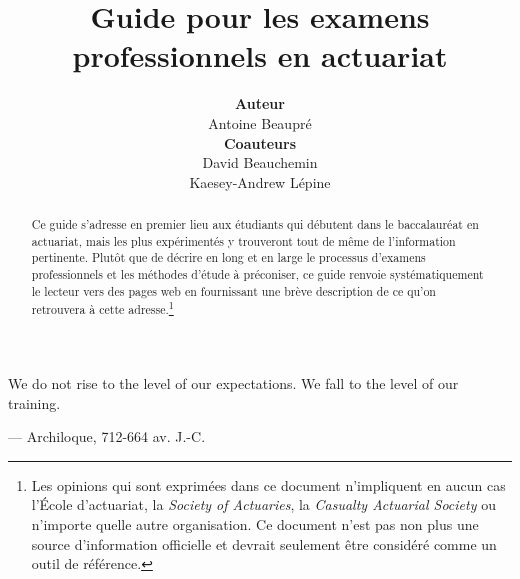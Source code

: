 \documentclass[11pt,french]{article}
\title{\vspace{2cm}
	   Guide pour les examens professionnels en actuariat
       \vspace{2cm}}
\author{\textbf{Auteur} \\
				Antoine Beaupré \vspace{2cm} \\
				\textbf{Coauteurs} \\
				David Beauchemin \\ 
				Kaesey-Andrew Lépine \vspace{4cm}}
\begin{document}
\maketitle
\thispagestyle{fancy}

\newpage

\begin{abstract}
Ce guide s'adresse en premier lieu aux étudiants qui débutent dans le baccalauréat en actuariat, mais les plus expérimentés y trouveront tout de même de l'information pertinente. Plutôt que de décrire en long et en large le processus d'examens professionnels et les méthodes d'étude à préconiser, ce guide renvoie systématiquement le lecteur vers des pages web en fournissant une brève description de ce qu'on retrouvera à cette adresse.\footnote{Les opinions qui sont exprimées dans ce document n'impliquent en aucun cas l'École d'actuariat, la \emph{Society of Actuaries}, la \emph{Casualty Actuarial Society} ou n'importe quelle autre organisation. Ce document n'est pas non plus une source d'information officielle et devrait seulement être considéré comme un outil de référence.}{\tiny} 
\end{abstract}

\clearpage
{}
\begin{center}
\begin{minipage}{.6\textwidth}
\epigraph{We do not rise to the level of our expectations. We fall to the level of our training.}{--- \textup{Archiloque}, 712-664 av. J.-C.}
\end{minipage}
\end{center}
\clearpage

\newpage
\tableofcontents

\newpage
{}
\setcounter{page}{1}








\end{document}
